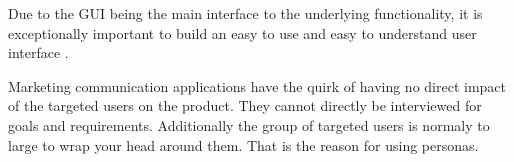 Due to the GUI being the main interface to the underlying functionality, it is exceptionally important to build an easy to use and easy to understand user interface \parencite[cf.][2]{Dray.1995}.


Marketing communication applications have the quirk of having no direct impact of the targeted users on the product. They cannot directly be interviewed for goals and requirements. Additionally the group of targeted users is normaly to large to wrap your head around them. That is the reason for using personas.